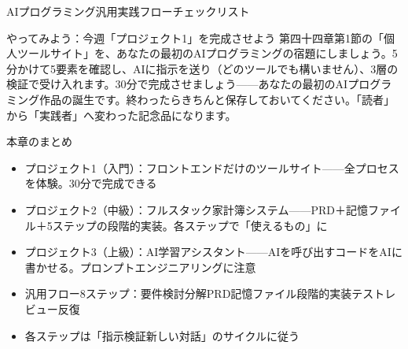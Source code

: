 \begin{center}\small\color{gray}AIプログラミング汎用実践フローチェックリスト\end{center}

\begin{tcbpractice}{やってみよう：今週「プロジェクト1」を完成させよう}
第四十四章第1節の「個人ツールサイト」を、あなたの最初のAIプログラミングの宿題にしましょう。5分かけて5要素を確認し、AIに指示を送り（どのツールでも構いません）、3層の検証で受け入れます。30分で完成させましょう——あなたの最初のAIプログラミング作品の誕生です。終わったらきちんと保存しておいてください。「読者」から「実践者」へ変わった記念品になります。

\end{tcbpractice}

\begin{tcbsummary}{本章のまとめ}
\begin{itemize}
  \item プロジェクト1（入門）：フロントエンドだけのツールサイト——全プロセスを体験。30分で完成できる
  \item プロジェクト2（中級）：フルスタック家計簿システム——PRD＋記憶ファイル＋5ステップの段階的実装。各ステップで「使えるもの」に
  \item プロジェクト3（上級）：AI学習アシスタント——AIを呼び出すコードをAIに書かせる。プロンプトエンジニアリングに注意
  \item 汎用フロー8ステップ：要件検討分解PRD記憶ファイル段階的実装テストレビュー反復
  \item 各ステップは「指示検証新しい対話」のサイクルに従う
\end{itemize}

\end{tcbsummary}
